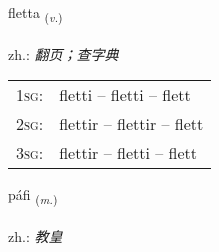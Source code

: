 \documentclass[frontgrid, backgrid]{flacards}\usepackage[]{graphicx}\usepackage[]{xcolor}
\begin{document}
\renewcommand{\flhead}{\vskip5pt \fboxsep=0pt {\small\bfseries\footnotesize Sagnorð | 动词}}
\renewcommand{\fcfoot}{\vskip5pt \fboxsep=0pt \hspace{2pt}{\small\bfseries\footnotesize 3K}}

\renewcommand{\blhead}{\vskip5pt {\small\bfseries\footnotesize Sagnorð | 动词 }}
\renewcommand{\bcfoot}{\vskip5pt \hspace{2pt}{\small\bfseries\footnotesize 3K}}


{fletta \small{\textsubscript{(\textit{v.})}} \\[1ex] %
\textphonetic{[flɛhta]} \\
zh.: \emph{翻页；查字典} \\  [2ex]
\renewcommand*{\arraystretch}{0.8}
\begin{tabular}{p{1cm}l}
\textsc{1sg}: & fletti -- fletti -- flett \\ 
\textsc{2sg}: & flettir -- flettir -- flett \\ 
\textsc{3sg}: & flettir -- fletti -- flett \\ 
\end{tabular}
}

\renewcommand{\flhead}{\vskip5pt \fboxsep=0pt {\small\bfseries\footnotesize Nafnorð | 名词}}
\renewcommand{\fcfoot}{\vskip5pt \fboxsep=0pt \hspace{2pt}{\small\bfseries\footnotesize 3K}}

\renewcommand{\blhead}{\vskip5pt {\small\bfseries\footnotesize Nafnorð | 名词 }}
\renewcommand{\bcfoot}{\vskip5pt \hspace{2pt}{\small\bfseries\footnotesize 3K}}


{páfi \small{\textsubscript{(\textit{m.})}} \\[1ex] %
\textphonetic{[pʰauːvɪ]} \\
zh.: \emph{教皇} \\  [2ex]
\renewcommand*{\arraystretch}{0.8}
}
\end{document}
